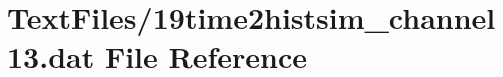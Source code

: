 \hypertarget{19time2histsim__channel13_8dat}{}\section{Text\+Files/19time2histsim\+\_\+channel13.dat File Reference}
\label{19time2histsim__channel13_8dat}
